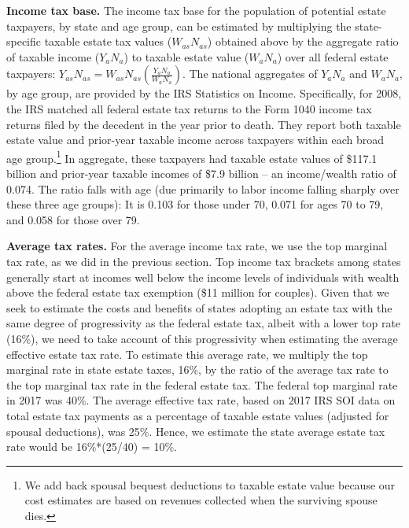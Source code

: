 \documentclass[12pt]{article}
\begin{document}
\textbf{Income tax base.}
The income tax base for the population of potential estate taxpayers, by state and age group, can be estimated by multiplying the state-specific taxable estate tax values ($W_{as} N_{as}$) obtained above by the aggregate ratio of taxable income ($Y_a N_a$) to taxable estate value ($W_a N_a$) over all federal estate taxpayers:
 $   Y_{as} N_{as} = W_{as} N_{as} \left(\frac{Y_a N_a}{W_a N_a}\right) $.
The national aggregates of $Y_a N_a$ and $W_a N_a$, by age group, are provided by the IRS Statistics on Income. Specifically, for 2008, the IRS matched all federal estate tax returns to the Form 1040 income tax returns filed by the decedent in the year prior to death. They report both taxable estate value and prior-year taxable income across taxpayers within each broad age group.\footnote{We add back spousal bequest deductions to taxable estate value because our cost estimates are based on revenues collected when the surviving spouse dies.} In aggregate, these taxpayers had taxable estate values of \$117.1 billion and prior-year taxable incomes of \$7.9 billion -- an income/wealth ratio of 0.074. The ratio falls with age (due primarily to labor income falling sharply over these three age groups): It is 0.103 for those under 70, 0.071 for ages 70 to 79, and 0.058 for those over 79.

\textbf{Average tax rates.}
For the average income tax rate, we use the top marginal tax rate, as we did in the previous section. Top income tax brackets among states generally start at incomes well below the income levels of individuals with wealth above the federal estate tax exemption (\$11 million for couples). Given that we seek to estimate the costs and benefits of states adopting an estate tax with the same degree of progressivity as the federal estate tax, albeit with a lower top rate (16\%), we need to take account of this progressivity when estimating the average effective estate tax rate. To estimate this average rate, we multiply the top marginal rate in state estate taxes, 16\%, by the ratio of the average tax rate to the top marginal tax rate in the federal estate tax. The federal top marginal rate in 2017 was 40\%. The average effective tax rate, based on 2017 IRS SOI data on total estate tax payments as a percentage of taxable estate values (adjusted for spousal deductions), was 25\%. Hence, we estimate the state average estate tax rate would be 16\%*(25/40) = 10\%.
\end{document}
